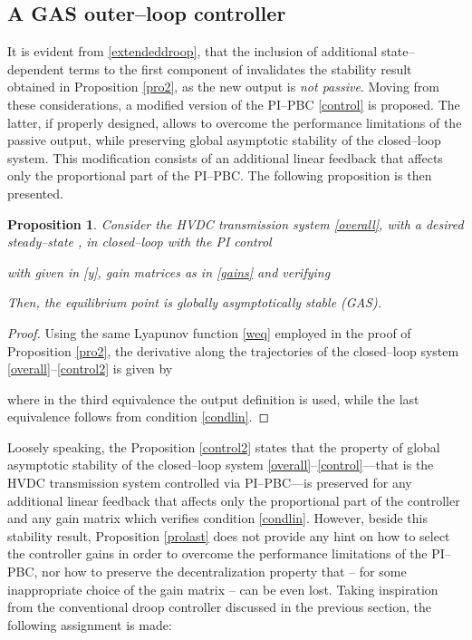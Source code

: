 \documentclass[5p,twocolumn]{elsarticle}
\def\lab{\label}
\newtheorem{proposition}[theorem]{Proposition}
\numberwithin{equation}{section}
\begin{document}
\subsection{A GAS outer--loop controller}
It is evident from \eqref{extendeddroop}, that the inclusion of additional state--dependent terms to the first component of  invalidates the stability result obtained in Proposition \ref{pro2}, as the new output  is {\em not passive}. Moving from these considerations, a modified version of the PI--PBC \eqref{control} is proposed. The latter, if properly designed, allows to overcome the performance  limitations of the passive output, while preserving global asymptotic stability of the closed--loop system. This modification consists of an additional linear feedback that affects only the proportional part of the PI--PBC.  The following  proposition is then presented.\\
\begin{proposition}\em
\lab{prolast}
Consider the HVDC transmission system \eqref{overall}, with a desired steady--state , in closed--loop with the PI control

with  given in \eqref{y}, gain matrices  as in \eqref{gains} and \mbox{} verifying

 Then, the equilibrium point  is globally asymptotically stable (GAS).
\end{proposition}
\begin{proof}
Using the same Lyapunov function \eqref{weq} employed in the proof of Proposition \ref{pro2}, the derivative along the trajectories of the closed--loop system \eqref{overall}--\eqref{control2} is given by


where in the third equivalence the output definition \mbox{} is used, while the last equivalence follows from condition \eqref{condlin}.
\end{proof}
\smallbreak

Loosely speaking, the Proposition \ref{control2} states that the property of global asymptotic stability of the closed--loop system \eqref{overall}--\eqref{control}---that is the HVDC transmission system controlled via PI--PBC---is preserved for any additional linear feedback that affects only the proportional part of the controller and any gain matrix  which verifies condition \eqref{condlin}. However, beside this stability result, Proposition \ref{prolast} does not provide any hint on how to select the controller gains in order to overcome the performance limitations of the PI--PBC, nor how to preserve the decentralization property that -- for some inappropriate choice of the gain matrix -- can be even lost. Taking inspiration from the conventional droop controller discussed in the previous section, the following assignment is made:
\end{document}
